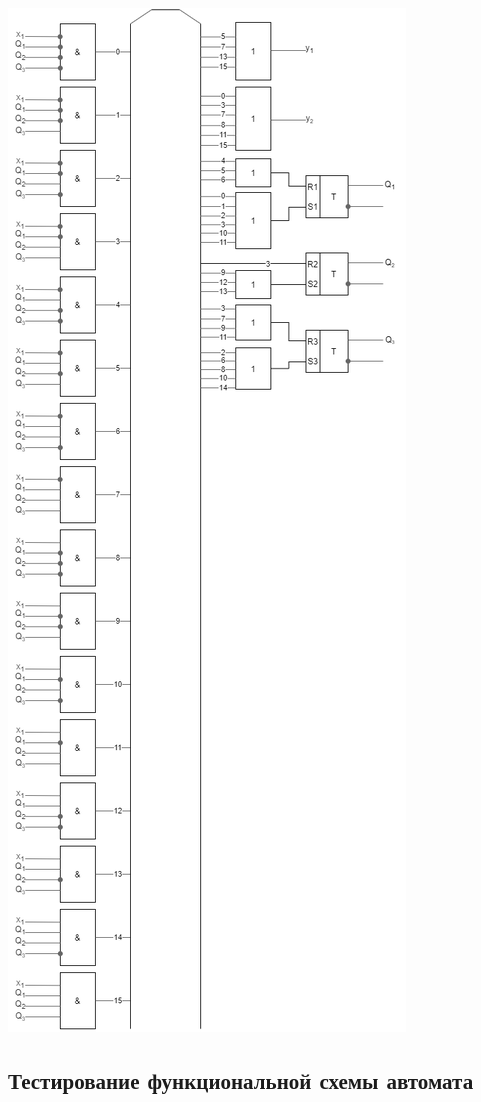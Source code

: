 \documentclass[12pt, a4paper]{article}
\begin{document}
\begin{center}
  \includegraphics[scale=0.5]{rs-trigger.png}
\end{center}

\subsection*{Тестирование функциональной схемы автомата}
\end{document}
